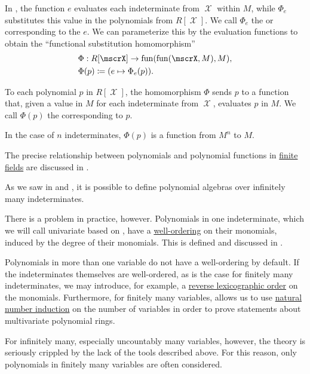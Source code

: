 \begin{concept}\label{con:substitution_homomorphism}
  In , the function \( e \) evaluates each indeterminate from \( \mscrX \) within \( M \), while \( \Phi_e \) substitutes this value in the polynomials from \( R[\mscrX] \). We call \( \Phi_e \) the  or  corresponding to the  \( e \). We can parameterize this by the evaluation functions to obtain the \enquote{functional substitution homomorphism}
  \begin{equation*}
    \begin{aligned}
      &\Phi: R[\mscrX] \to \fun(\fun(\mscrX, M), M), \\
      &\Phi(p) \coloneqq (e \mapsto \Phi_e(p)).
    \end{aligned}
  \end{equation*}

  To each polynomial \( p \) in \( R[\mscrX] \), the homomorphism \( \Phi \) sends \( p \) to a function that, given a value in \( M \) for each indeterminate from \( \mscrX \), evaluates \( p \) in \( M \). We call \( \Phi(p) \) the  corresponding to \( p \).

  In the case of \( n \) indeterminates, \( \Phi(p) \) is a function from \( M^n \) to \( M \).

  The precise relationship between polynomials and polynomial functions in \hyperref[thm:finite_fields]{finite fields} are discussed in .
\end{concept}

\begin{remark}\label{rem:polynomials_over_infinitely_many_indeterminates}
  As we saw in  and , it is possible to define polynomial algebras over infinitely many indeterminates.

  There is a problem in practice, however. Polynomials in one indeterminate, which we will call univariate based on , have a \hyperref[def:well_ordered_set]{well-ordering} on their monomials, induced by the degree of their monomials. This is defined and discussed in .

  Polynomials in more than one variable do not have a well-ordering by default. If the indeterminates themselves are well-ordered, as is the case for finitely many indeterminates, we may introduce, for example, a \hyperref[def:lexicographic_order]{reverse lexicographic order} on the monomials. Furthermore, for finitely many variables,  allows us to use \hyperref[con:induction/peano_arithmetic]{natural number induction} on the number of variables in order to prove statements about multivariate polynomial rings.

  For infinitely many, especially uncountably many variables, however, the theory is seriously crippled by the lack of the tools described above. For this reason, only polynomials in finitely many variables are often considered.
\end{remark}

